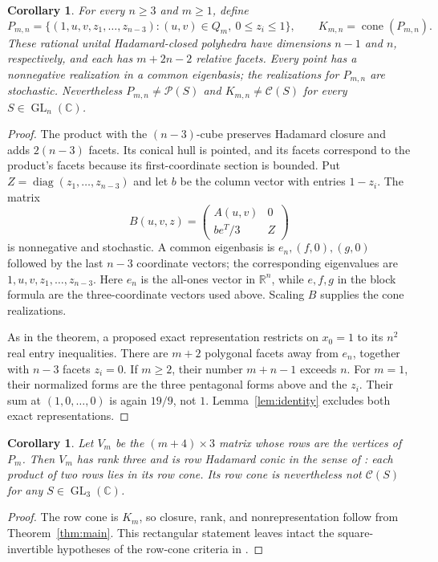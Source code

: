 \documentclass[11pt,a4paper]{article}
\newtheorem{corollary}[theorem]{Corollary}
\newcommand{\R}{\mathbb R}
\newcommand{\C}{\mathbb C}
\newcommand{\cone}{\operatorname{cone}}
\newcommand{\diag}{\operatorname{diag}}
\begin{document}
\begin{corollary}\label{cor:alln}
For every $n\geq3$ and $m\geq1$, define
\[
 P_{m,n}=\{(1,u,v,z_1,\ldots,z_{n-3}):(u,v)\in Q_m,
                        \ 0\leq z_i\leq1\},\qquad
 K_{m,n}=\cone(P_{m,n}).
\]
These rational unital Hadamard-closed polyhedra have dimensions $n-1$
and $n$, respectively, and each has $m+2n-2$ relative facets.
Every point has a nonnegative realization in a common eigenbasis;
the realizations for $P_{m,n}$ are stochastic. Nevertheless
$P_{m,n}\ne\mathcal P(S)$ and $K_{m,n}\ne\mathcal C(S)$ for every
$S\in\operatorname{GL}_n(\C)$.
\end{corollary}
\begin{proof}
The product with the $(n-3)$-cube preserves Hadamard closure and adds
$2(n-3)$ facets. Its conical hull is pointed, and its facets correspond
to the product's facets because its first-coordinate section is bounded.
Put $Z=\diag(z_1,\ldots,z_{n-3})$ and let $b$ be the column vector
with entries $1-z_i$. The matrix
\[
 B(u,v,z)=\begin{pmatrix}
 A(u,v)&0\\ b e^T/3&Z
 \end{pmatrix}
\]
is nonnegative and stochastic. A common eigenbasis is
$e_n,(f,0),(g,0)$ followed by the last $n-3$ coordinate vectors;
the corresponding eigenvalues are $1,u,v,z_1,\ldots,z_{n-3}$.
Here $e_n$ is the all-ones vector in $\R^n$, while $e,f,g$ in the
block formula are the three-coordinate vectors used above.
Scaling $B$ supplies the cone realizations.

As in the theorem, a proposed exact representation restricts on $x_0=1$
to its $n^2$ real entry inequalities. There are $m+2$ polygonal facets
away from $e_n$, together with $n-3$ facets $z_i=0$.
If $m\geq2$, their number $m+n-1$ exceeds $n$.
For $m=1$, their normalized forms are the three pentagonal forms above
and the $z_i$. Their sum at $(1,0,\ldots,0)$ is again $19/9$, not $1$.
Lemma~\ref{lem:identity} excludes both exact representations.
\end{proof}

\begin{corollary}\label{cor:rhc}
Let $V_m$ be the $(m+4)\times3$ matrix whose rows are the vertices of
$P_m$. Then $V_m$ has rank three and is row Hadamard conic in the sense
of \cite[Definition~2.3]{JP17}: each product of two rows lies in its
row cone. Its row cone is nevertheless not $\mathcal C(S)$ for any
$S\in\operatorname{GL}_3(\C)$.
\end{corollary}
\begin{proof}
The row cone is $K_m$, so closure, rank, and nonrepresentation follow
from Theorem~\ref{thm:main}. This rectangular statement leaves intact the
square-invertible hypotheses of the row-cone criteria in \cite{JP17}.
\end{proof}
\end{document}
